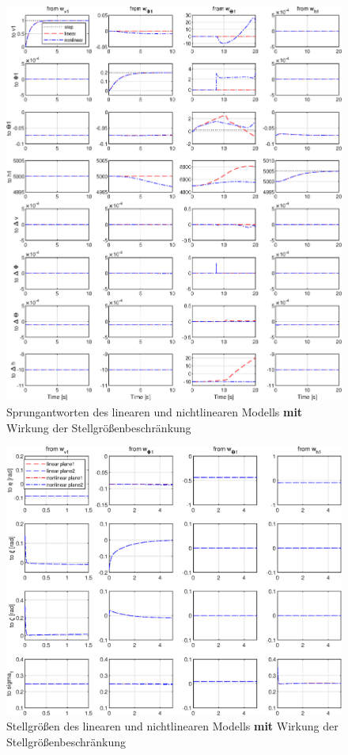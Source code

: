 \begin{figure}[h] %
	\centering
	\includegraphics[width=\linewidth]{./Bilder/outputs_linear_nlinear_mit_stellbeschr.eps}
	\caption{Sprungantworten des linearen und nichtlinearen Modells \textbf{mit} Wirkung der Stellgrößenbeschränkung}
	\label{fig:outputs_linear_nlinear_mit_stellbeschr}
\end{figure}
\begin{figure}[h] %
	\centering
	\includegraphics[width=\linewidth]{./Bilder/stellgr_linear_nlinear_mit_stellbeschr.eps}
	\caption{Stellgrößen des linearen und nichtlinearen Modells \textbf{mit} Wirkung der Stellgrößenbeschränkung}
	\label{fig:stellgr_linear_nlinear_mit_stellbeschr}
\end{figure}


